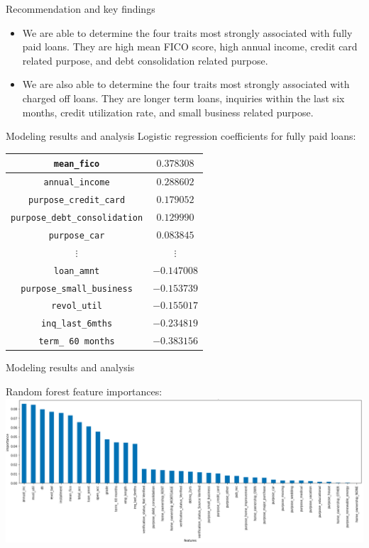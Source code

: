 \documentclass{beamer}
\begin{document}
\begin{frame}{Recommendation and key findings}
\begin{itemize}
\item
We are able to determine the four traits most strongly associated with
fully paid loans. They are high mean FICO score, high annual income, 
credit card related purpose, and debt consolidation related purpose.
\item
We are also able to determine the four traits most strongly
associated with charged off loans. They are longer term loans, inquiries
within the last six months, credit utilization rate, and small business
related purpose.
\end{itemize}
\end{frame}

\begin{frame}{Modeling results and analysis}
Logistic regression coefficients for fully paid loans:
\begin{center}
\begin{tabular}{|c|c|}\hline
\texttt{mean\_fico} & $0.378308$ \\\hline
\texttt{annual\_income} & $0.288602$ \\\hline
\texttt{purpose\_credit\_card} & $0.179052$ \\\hline
\texttt{purpose\_debt\_consolidation} & $0.129990$ \\\hline
\texttt{purpose\_car} & $0.083845$ \\\hline
$\vdots$ & $\vdots$ \\\hline
\texttt{loan\_amnt} & $-0.147008$ \\\hline
\texttt{purpose\_small\_business} & $-0.153739$ \\\hline
\texttt{revol\_util} & $-0.155017$ \\\hline
\texttt{inq\_last\_6mths} & $-0.234819$ \\\hline
\texttt{term\_ 60 months} & $-0.383156$ \\\hline
\end{tabular}
\end{center}
\end{frame}

\begin{frame}{Modeling results and analysis}
\begin{center}
Random forest feature importances:
\includegraphics[scale=0.3]{random-forest-feature-importances}
\end{center}
\end{frame}
\end{document}

